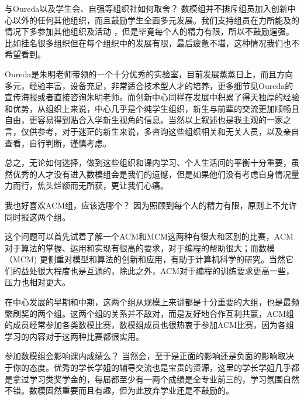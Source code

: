 \documentclass{beamer}
\begin{document}
\begin{frame}
    \begin{exampleblock}{与Oureda以及学生会、自强等组织社如何取舍？}
    数模组并不排斥组员加入创新中心以外的任何其他组织，而且鼓励学生全面多元发展。我们支持组员在力所能及的情况下多参加其他组织及活动 ，但是毕竟每个人的精力有限，所以不鼓励逞强。比如挂名很多组织但在每个组织中的发展有限，最后疲惫不堪，这种情况我们也不希望看到。
    
    Oureda是朱明老师带领的一个十分优秀的实验室，目前发展蒸蒸日上，而且方向多元，经验丰富，设备充足，非常适合技术型人才的培养，更多细节见Oureda的宣传海报或者直接咨询朱明老师。而创新中心同样在发展中积累了得天独厚的经验和优势，从组织上来说，中心几乎是个纯学生组织，新生与前辈的交流更加顺畅且自由，更容易得到贴合入学新生视角的信息。当然以上叙述也是我主观的一家之言，仅供参考，对于迷茫的新生来说，多咨询这些组织相关和无关人员，以及亲自查看，自行判断，谨慎考虑。
    
    总之，无论如何选择，做到这些组织和课内学习、个人生活间的平衡十分重要，虽然优秀的人才没有进入数模组会是我们的遗憾，但是如果他们没有考虑自身情况量力而行，焦头烂额而无所获，更让我们心痛。
    \end{exampleblock}
\end{frame}

\begin{frame}
\begin{alertblock}{我也好喜欢ACM组，应该选哪个？}
因为照顾到每个人的精力有限，原则上不允许同时报这两个组。

这个问题可以首先试着了解一个ACM和MCM这两种有很大和区别的比赛，ACM对于算法的掌握、运用和实现有很高的要求，对于编程的帮助很大；而数模（MCM) 更侧重对模型和算法的创新和应用，有助于计算机科学的研究。当然它们的益处很大程度也是互通的，除此之外，ACM对于编程的训练要求更高一些，压力也相对更大。

在中心发展的早期和中期，这两个组从规模上来讲都是十分重要的大组，也是最频繁刷奖的两个组。这两个组的关系并不敌对，而是友好地合作互利共赢，ACM组的成员经常参加各类数模比赛，数模组成员也很热衷于参加ACM比赛，因为各组学习的内容对于这两种比赛都很实用。
\end{alertblock}

\begin{block}{参加数模组会影响课内成绩么？}
当然会，至于是正面的影响还是负面的影响取决于你的态度。优秀的学长学姐的辅导交流也是宝贵的资源，这里的学长学姐几乎都是拿过学习类奖学金的，每届都至少有一两个成绩是全专业前三的，学习氛围自然不错。数模固然重要而且有趣，但为此放弃学业还是不鼓励的。
\end{block}
\end{frame}
\end{document}
